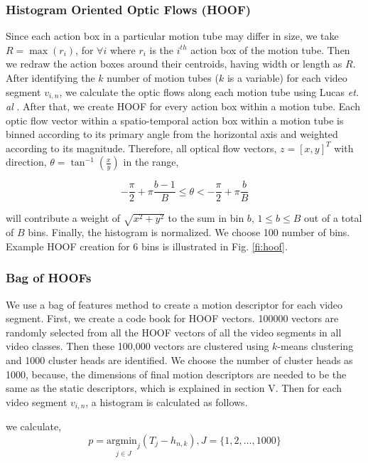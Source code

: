 \subsubsection{Histogram Oriented Optic Flows (HOOF)}
Since each action box in a particular motion tube may differ in size, we take $R = \max(r_{i})$, for $\forall{i}$
where $r_{i}$ is the $i^{th}$ action box of the motion tube. Then we redraw the action boxes around their centroids, having width or length as $R$.
After identifying the $k$ number of motion tubes ($k$ is a variable) for each video segment $v_{i,n}$, we calculate the optic flows along each motion tube
using Lucas \textit{et. al} \cite{lucas1981iterative}.
After that, we create HOOF\cite{chaudhry2009histograms} for every
action box within a motion tube. Each optic flow vector within a spatio-temporal action box within a motion tube is binned according
to its primary angle from the horizontal axis and weighted according to its magnitude.  Therefore, all optical flow vectors, $z=[x,y]^T$ with direction,
$\theta = \tan^{-1}(\frac{x}{y})$ in the range,

\begin{equation}
- \frac{\pi}{2} + \pi\frac{b-1}{B} \leq \theta < -\frac{\pi}{2} + \pi\frac{b}{B}
\end{equation}

will contribute a weight of $\sqrt{x^2 + y^2}$ to the sum in bin $b$, $1 \leq b \leq B$ out of a total of
$B$ bins. Finally, the histogram is normalized. We choose 100 number of bins. Example HOOF creation for 6 bins is illustrated in Fig. \ref{fi:hoof}.

\subsubsection{Bag of HOOFs}
We use a bag of features method to create a motion descriptor for each video segment. First, we create a code book for HOOF vectors.
100000 vectors are randomly selected from all the HOOF vectors of all the video segments in all video classes.
Then these 100,000 vectors are clustered using $k$-means clustering and 1000 cluster heads
are identified. We choose the number of cluster heads as 1000, because, the dimensions of final motion descriptors are needed to be the same as
the static descriptors, which is explained in section V. Then for each video segment $v_{i,n}$, a histogram is calculated as follows.


we calculate,
\begin{equation}
p = \underset{j\in J}{\mathrm{argmin}_{j}}(T_{j}-h_{n,k}), J=\{1,2,\dots,1000\}
\end{equation}

